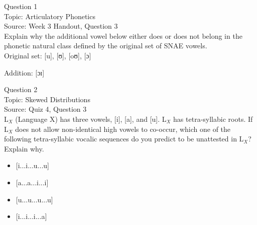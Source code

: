 \documentclass[12pt]{article}
\begin{document}
\begin{center}
\textbf{{\color{violet}{\HUGE 20201103 Tuesday\\}}}

\textbf{{\color{violet}{\HUGE ALL EXAMS\\}}}

\end{center}
\newpage

\begin{center}
\textbf{{\color{blue}{\HUGE START OF EXAM\\}}}

\textbf{{\color{blue}{\HUGE Student ID: 43803\\}}}

\textbf{{\color{blue}{\HUGE 4:00\\}}}

\end{center}
\newpage

{\large Question 1}\\

Topic: Articulatory Phonetics\\
Source: Week 3 Handout, Question 3\\

Explain why the additional vowel below either does or does not belong in the phonetic natural class defined by the original set of SNAE vowels.\\

Original set: {[u]}, {[ʊ]}, {[oʊ]}, {[ɔ]}

Addition: {[ɔɪ]}


\newpage

{\large Question 2}\\

Topic: Skewed Distributions\\
Source: Quiz 4, Question 3\\

L$_X$ (Language X) has three vowels, [i], [a], and [u]. L$_X$ has tetra-syllabic roots. If L$_X$ does not allow non-identical high vowels to co-occur, which one of the following tetra-syllabic vocalic sequences do you predict to be unattested in L$_X$? Explain why.\\

\begin{itemize} \item {[i...i...u...u]} \item {[a...a...i...i]} \item {[u...u...u...u]} \item {[i...i...i...a]} \end{itemize}
\end{document}
